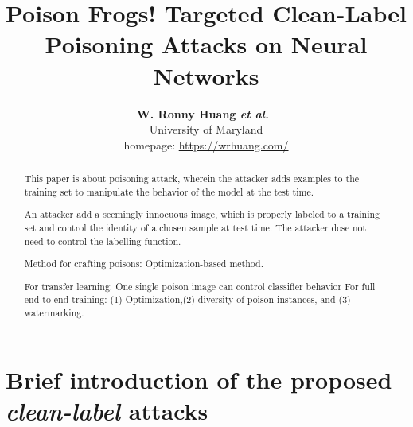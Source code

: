 \documentclass[11pt]{article}
\numberwithin{equation}{section}
\newcommand{\etal}{{\em et al.}\ }
\begin{document}


\title{Poison Frogs! Targeted Clean-Label Poisoning
Attacks on Neural Networks}

\author{\textbf{W. Ronny Huang \etal} \\ University of Maryland\\homepage: \url{https://wrhuang.com/}}


\maketitle

\begin{abstract}

This paper is about poisoning attack, wherein the attacker adds examples to the training set to manipulate the behavior of the model at the test time.

An attacker add a seemingly innocuous image, which is properly labeled to a training set and control the identity of a chosen sample at test time. The attacker dose not need to control the labelling function.

Method for crafting poisons: Optimization-based method.

For transfer learning: One single poison image can control classifier behavior
For full end-to-end training: (1) Optimization,(2) diversity of poison instances, and (3) watermarking.
\end{abstract}




\section{Brief introduction of the proposed \textit{clean-label} attacks} \label{sec:optimization}
\end{document}
